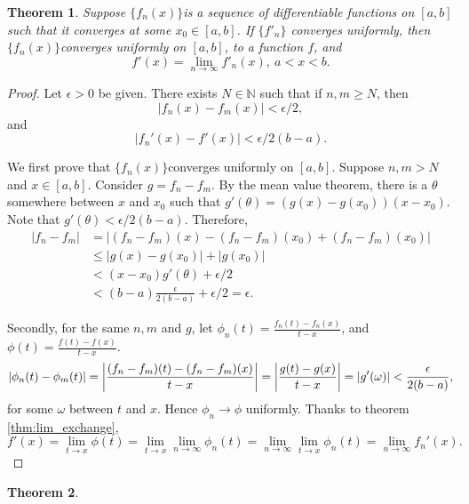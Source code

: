 \documentclass[12pt]{article}
\newtheorem{thm}{Theorem}[section]
\newcommand{\fseq}{$\{f_n(x)\}$}
\newcommand{\N}{\mathbb{N}}
\begin{document}
\begin{thm}
	Suppose \fseq is a sequence of differentiable functions on $[a, b]$ such that it converges at some $x_0 \in [a, b]$. If $\{f'_n\}$ converges uniformly, then \fseq converges uniformly on $[a, b]$, to a function $f$, and \[f'(x) = \lim_{n \rightarrow \infty} f'_n(x), ~ a < x < b.\]
\end{thm}
\begin{proof}
	Let $\epsilon > 0$ be given. There exists $N \in \N$ such that if $n, m \geq N$, then \[|f_n(x) - f_m(x)| < \epsilon/2,\] and \[|f_n'(x) - f'(x)| < \epsilon/2(b-a).\]
	
	We first prove that \fseq converges uniformly on $[a, b]$. Suppose $n, m > N$ and $x \in [a, b]$. Consider $g = f_n - f_m$. By the mean value theorem, there is a $\theta$ somewhere between $x$ and $x_0$ such that $g'(\theta) = \left( g(x) - g(x_0) \right) (x-x_0)$. Note that $g'(\theta) < \epsilon/2(b-a)$. Therefore,
	\begin{align*}
		|f_n - f_m| &= \left|(f_n - f_m)(x) - (f_n - f_m)(x_0) + (f_n - f_m)(x_0) \right| \\
			&\leq |g(x) - g(x_0)| + |g(x_0)| \\
			&< (x - x_0)g'(\theta) + \epsilon/2 \\
			&< (b-a) \frac{\epsilon}{2(b-a)} + \epsilon/2 = \epsilon.
	\end{align*}
	
	Secondly, for the same $n, m$ and $g$, let $\phi_n(t) = \frac{f_n(t)-f_n(x)}{t-x}$, and $\phi(t) = \frac{f(t) - f(x)}{t-x}$.
	\[
		|\phi_n(t) - \phi_m(t)| = \left| \frac{(f_n - f_m)(t) - (f_n - f_m)(x)}{t-x}\right| = \left| \frac{g(t) - g(x)}{t-x} \right| = |g'(\omega)| \\ < \frac{\epsilon}{2(b-a)},
	\] for some $\omega$ between $t$ and $x$. Hence $\phi_n \rightarrow \phi$ uniformly. Thanks to theorem \ref{thm:lim_exchange}, \[f'(x) = \lim_{t \rightarrow x} \phi(t) = \lim_{t \rightarrow x} \lim_{n \rightarrow \infty} \phi_n(t) = \lim_{n \rightarrow \infty} \lim_{t \rightarrow x} \phi_n(t) = \lim_{n \rightarrow \infty} f_n'(x). \]
	
\end{proof}

\begin{thm}
	
\end{thm}
\end{document}
